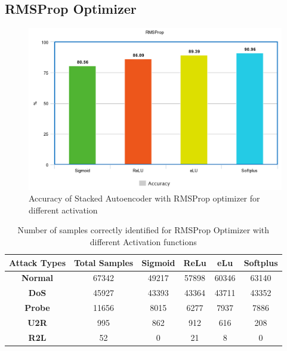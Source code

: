 \documentclass[12pt, a4paper]{report}
\begin{document}
\begin{appendices}
	
	
   \section{RMSProp Optimizer}
   \begin{figure}[h]
\centering
\captionsetup{justification=centering,margin=2cm}
\includegraphics[width=13cm]{accuracy_rmsprop_tflearn.png}
\caption{ Accuracy of Stacked Autoencoder with RMSProp optimizer for different activation }
\label{fig:acc_rms}
\end{figure}
\clearpage
\begin{table}[h]
\centering
\captionsetup{justification=centering,margin=2cm}
\begin{tabular}{|c|c|c|c|c|c|}
\hline
\textbf{Attack Types} & \textbf{Total Samples} & \textbf{Sigmoid} & \textbf{ReLu} & \textbf{eLu} & \textbf{Softplus} \\ \hline
\textbf{Normal}       & 67342                  & 49217            & 57898         & 60346        & 63140             \\ \hline
\textbf{DoS}          & 45927                  & 43393            & 43364         & 43711        & 43352             \\ \hline
\textbf{Probe}        & 11656                  & 8015             & 6277          & 7937         & 7886              \\ \hline
\textbf{U2R}          & 995                    & 862              & 912           & 616          & 208               \\ \hline
\textbf{R2L}          & 52                     & 0               & 21            & 8           & 0                \\ \hline
\end{tabular}
\caption{Number of samples correctly identified for RMSProp Optimizer with different Activation functions}
\label{confusion_rms_tflearn}
\end{table}



\end{appendices}
\end{document}
